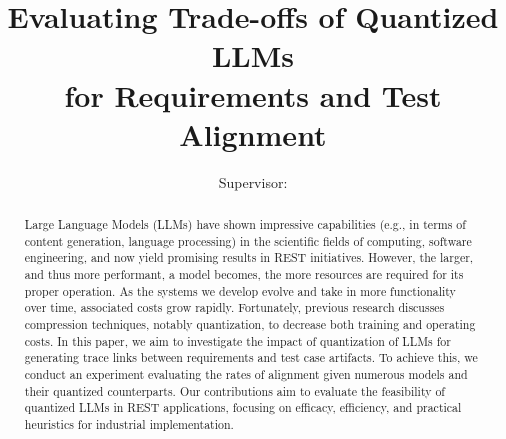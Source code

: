\documentclass[conference]{IEEEtran}
\begin{document}
\title{Evaluating Trade-offs of Quantized LLMs \\ for Requirements and Test Alignment}


\author{
  \and
  \and
  \and
  \centering %
  Supervisor:
}

\maketitle

\begin{abstract}
Large Language Models (LLMs) have shown impressive capabilities (e.g., in terms of content generation, language processing) in the scientific fields of computing, software engineering, and now yield promising results in REST initiatives. However, the larger, and thus more performant, a model becomes, the more resources are required for its proper operation. As the systems we develop evolve and take in more functionality over time, associated costs grow rapidly. Fortunately, previous research discusses compression techniques, notably quantization, to decrease both training and operating costs. In this paper, we aim to investigate the impact of quantization of LLMs for generating trace links between requirements and test case artifacts. To achieve this, we conduct an experiment evaluating the rates of alignment given numerous models and their quantized counterparts. Our contributions aim to evaluate the feasibility of quantized LLMs in REST applications, focusing on efficacy, efficiency, and practical heuristics for industrial implementation.
\end{abstract}
\end{document}
